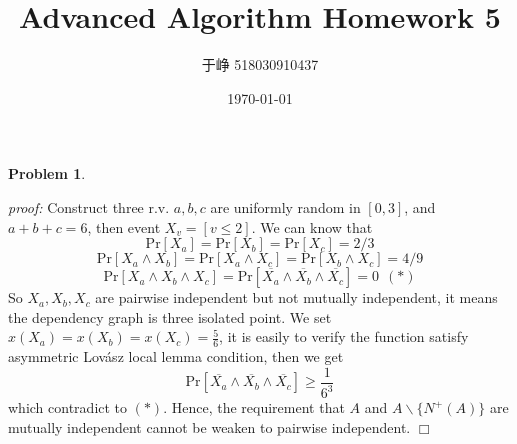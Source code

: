 \documentclass{article}
\title{Advanced Algorithm Homework 5}
\author{于峥 518030910437}
\date{\today}
\newtheorem{problem}[theorem]{Problem}
\newenvironment{solution}{\noindent \textit{proof:}}{$\Box$}
\begin{document}
    \maketitle
    
\begin{problem}
\end{problem}
\begin{solution}
    Construct three r.v. $a, b, c$ are uniformly random in $[0, 3]$, and $a+b+c=6$,
    then event $X_v = [v \leq 2]$. We can know that 
    $$ \mathrm{Pr}[X_a] = \mathrm{Pr}[X_b] = \mathrm{Pr}[X_c] = 2/3 $$
    $$ \mathrm{Pr}[X_a \land X_b] = \mathrm{Pr}[X_a \land X_c] = \mathrm{Pr}[X_b\land X_c] = 4/9 $$
    $$ \mathrm{Pr}[X_a\land X_b \land X_c]= \mathrm{Pr}[\overline{X_a}\land \overline{X_b} \land \overline{X_c}]=0 ~~ (*)$$
    So $X_a, X_b, X_c$ are pairwise independent but not mutually independent, it means the dependency graph is three
    isolated point. We set $x(X_a)=x(X_b)=x(X_c)=\frac 5 6$, it is easily to verify the function satisfy 
    asymmetric Lovász local lemma condition, then we get
    $$
    \mathrm{Pr}[\overline{X_a}\land \overline{X_b} \land \overline{X_c}] \geq \frac {1} {6^3}
    $$
    which contradict to $(*)$. 
    Hence, the requirement that $A$ and $A\backslash \{N^+(A)\}$ are mutually independent cannot be weaken to pairwise independent.
\end{solution}
\end{document}
